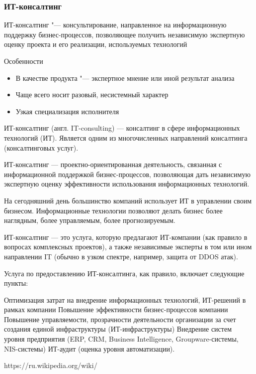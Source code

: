 \documentclass{../industrial-development}
\begin{document}
\begin{frame} \frametitle{ИТ-консалтинг}
	\begin{block}{}
		\alert{ИТ-консалтинг} "--- консультирование, направленное на  информационную поддержку бизнес-процессов, позволяющее получить независимую экспертную оценку проекта и его реализации, используемых технологий
	\end{block}
	\begin{block}{Особенности}
		\begin{itemize}
			\item В качестве продукта "--- экспертное мнение или иной результат анализа
			\item Чаще всего носит разовый, несистемный характер
			\item Узкая специализация исполнителя
		\end{itemize}
	\end{block}
\end{frame}
\lecturenotes
ИТ-консалтинг (англ. IT-consulting) — консалтинг в сфере информационных технологий (ИТ). Является одним из многочисленных направлений консалтинга (консалтинговых услуг).

ИТ-консалтинг — проектно-ориентированная деятельность, связанная с информационной поддержкой бизнес-процессов, позволяющая дать независимую экспертную оценку эффективности использования информационных технологий.

На сегодняшний день большинство компаний использует ИТ в управлении своим бизнесом. Информационные технологии позволяют делать бизнес более наглядным, более управляемым, более прогнозируемым.

ИТ-консалтинг — это услуга, которую предлагают ИТ-компании (как правило в вопросах комплексных проектов), а также независимые эксперты в том или ином направлении IT (обычно в узком спектре, например, защита от DDOS атак).

Услуга по предоставлению ИТ-консалтинга, как правило, включает следующие пункты:

Оптимизация затрат на внедрение информационных технологий, ИТ-решений в рамках компании
Повышение эффективности бизнес-процессов компании
Повышение управляемости, прозрачности деятельности организации за счет создания единой инфраструктуры (ИТ-инфраструктуры)
Внедрение систем уровня предприятия (ERP, CRM, Business Intelligence, Groupware-системы, NIS-системы)
ИТ-аудит (оценка уровня автоматизации).

https://ru.wikipedia.org/wiki/%
\end{document}
